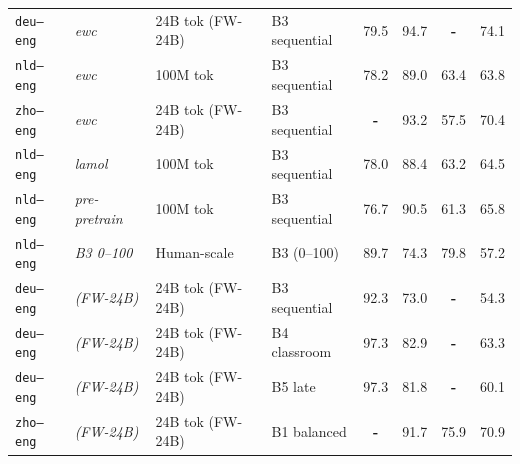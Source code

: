 \begin{table}[t]
\begin{tabular}{lll l cc cc}
\texttt{deu--eng} & \textit{ewc} & 24B tok (FW-24B) & B3 sequential & \cellcolor[rgb]{0.837,1.000,0.837} 79.5 & \cellcolor[rgb]{0.756,1.000,0.756} 94.7 & \textbf{-} & \cellcolor[rgb]{0.802,1.000,0.802} 74.1 \\
\texttt{nld--eng} & \textit{ewc} & 100M tok & B3 sequential & \cellcolor[rgb]{0.844,1.000,0.844} 78.2 & \cellcolor[rgb]{0.787,1.000,0.787} 89.0 & \cellcolor[rgb]{0.905,1.000,0.905} 63.4 & \cellcolor[rgb]{0.886,1.000,0.886} 63.8 \\
\texttt{zho--eng} & \textit{ewc} & 24B tok (FW-24B) & B3 sequential & \textbf{-} & \cellcolor[rgb]{0.764,1.000,0.764} 93.2 & \cellcolor[rgb]{0.947,1.000,0.947} 57.5 & \cellcolor[rgb]{0.832,1.000,0.832} 70.4 \\
\texttt{nld--eng} & \textit{lamol} & 100M tok & B3 sequential & \cellcolor[rgb]{0.845,1.000,0.845} 78.0 & \cellcolor[rgb]{0.791,1.000,0.791} 88.4 & \cellcolor[rgb]{0.906,1.000,0.906} 63.2 & \cellcolor[rgb]{0.881,1.000,0.881} 64.5 \\
\texttt{nld--eng} & \textit{pre-pretrain} & 100M tok & B3 sequential & \cellcolor[rgb]{0.852,1.000,0.852} 76.7 & \cellcolor[rgb]{0.779,1.000,0.779} 90.5 & \cellcolor[rgb]{0.920,1.000,0.920} 61.3 & \cellcolor[rgb]{0.870,1.000,0.870} 65.8 \\
\texttt{nld--eng} & \textit{B3 0--100} & Human-scale & B3 (0--100) & \cellcolor[rgb]{0.780,1.000,0.780} 89.7 & \cellcolor[rgb]{0.867,1.000,0.867} 74.3 & \cellcolor[rgb]{0.788,1.000,0.788} 79.8 & \cellcolor[rgb]{0.941,1.000,0.941} 57.2 \\
\texttt{deu--eng} & \textit{(FW-24B)} & 24B tok (FW-24B) & B3 sequential & \cellcolor[rgb]{0.766,1.000,0.766} 92.3 & \cellcolor[rgb]{0.875,1.000,0.875} 73.0 & \textbf{-} & \cellcolor[rgb]{0.965,1.000,0.965} 54.3 \\
\texttt{deu--eng} & \textit{(FW-24B)} & 24B tok (FW-24B) & B4 classroom & \cellcolor[rgb]{0.738,1.000,0.738} 97.3 & \cellcolor[rgb]{0.821,1.000,0.821} 82.9 & \textbf{-} & \cellcolor[rgb]{0.891,1.000,0.891} 63.3 \\
\texttt{deu--eng} & \textit{(FW-24B)} & 24B tok (FW-24B) & B5 late & \cellcolor[rgb]{0.738,1.000,0.738} 97.3 & \cellcolor[rgb]{0.827,1.000,0.827} 81.8 & \textbf{-} & \cellcolor[rgb]{0.917,1.000,0.917} 60.1 \\
\texttt{zho--eng} & \textit{(FW-24B)} & 24B tok (FW-24B) & B1 balanced & \textbf{-} & \cellcolor[rgb]{0.773,1.000,0.773} 91.7 & \cellcolor[rgb]{0.816,1.000,0.816} 75.9 & \cellcolor[rgb]{0.828,1.000,0.828} 70.9 \\

\end{tabular}
\end{table}
